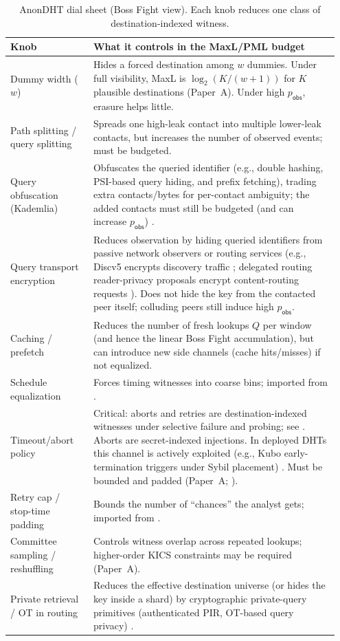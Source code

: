 \documentclass[11pt]{article}
\newcommand{\logtwo}{\log_2}
\begin{document}
\begin{table}[t]
\centering
\caption{AnonDHT dial sheet (Boss Fight view). Each knob reduces one class of destination-indexed witness.}
\label{tab:dials}
\begin{tabular}{p{0.24\linewidth} p{0.71\linewidth}}
\toprule
Knob & What it controls in the MaxL/PML budget \\
\midrule
Dummy width ($w$) & Hides a forced destination among $w$ dummies. Under full visibility, MaxL is $\logtwo(K/(w{+}1))$ for $K$ plausible destinations (Paper~A). Under high $p_{\mathsf{obs}}$, erasure helps little. \\
Path splitting / query splitting & Spreads one high-leak contact into multiple lower-leak contacts, but increases the number of observed events; must be budgeted. \\
Query obfuscation (Kademlia) & Obfuscates the queried identifier (e.g., double hashing, PSI-based query hiding, and prefix fetching), trading extra contacts/bytes for per-contact ambiguity; the added contacts must still be budgeted (and can increase $p_{\mathsf{obs}}$) \cite{daniel2025queryobfuscation}. \\
Query transport encryption & Reduces observation by hiding queried identifiers from passive network observers or routing services (e.g., Discv5 encrypts discovery traffic \cite{eth_discv5_spec}; delegated routing reader-privacy proposals encrypt content-routing requests \cite{ipip0421_reader_privacy,ipfs_http_routing_v1}). Does not hide the key from the contacted peer itself; colluding peers still induce high $p_{\mathsf{obs}}$. \\
Caching / prefetch & Reduces the number of fresh lookups $Q$ per window (and hence the linear Boss Fight accumulation), but can introduce new side channels (cache hits/misses) if not equalized. \\
Schedule equalization & Forces timing witnesses into coarse bins; imported from \cite{series:schedcompiler}. \\
Timeout/abort policy & Critical: aborts and retries are destination-indexed witnesses under selective failure and probing; see \cite{tran2009failure,mittal2012leaks}. Aborts are secret-indexed injections. In deployed DHTs this channel is actively exploited (e.g., Kubo early-termination triggers under Sybil placement) \cite{netto2025ipfs_sybil}. Must be bounded and padded (Paper~A; \cite{series:stoptimeaddendum,series:prefixcapacities}). \\
Retry cap / stop-time padding & Bounds the number of ``chances'' the analyst gets; imported from \cite{series:stoptimeaddendum}. \\
Committee sampling / reshuffling & Controls witness overlap across repeated lookups; higher-order KICS constraints may be required (Paper~A). \\
Private retrieval / OT in routing & Reduces the effective destination universe (or hides the key inside a shard) by cryptographic private-query primitives (authenticated PIR, OT-based query privacy) \cite{colombo2023apir,backes2012queryprivacy}. \\
\bottomrule
\end{tabular}
\end{table}
\end{document}
